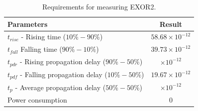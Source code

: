 \begin{table}[H]
	\centering
	\begin{tabular}{|p{.5\linewidth}|c|}
		\hline
		Parameters & Result\\
		\hline
		$t_{rise}$ - Rising time ($10\% - 90\%$) & $58.68\times10^{-12}$\\
		\hline
		$t_{fall}$  Falling time ($90\% - 10\%$) & $39.73\times10^{-12}$\\
		\hline
		$t_{pdr}$ - Rising propagation delay ($90\% - 50\%$) & $\times10^{-12}$\\
		\hline
		$t_{pdf}$ - Falling propagation delay ($10\% - 50\%$) & $19.67\times10^{-12}$\\
		\hline
		$t_{p}$ - Average propagation delay ($50\% - 50\%$) & $\times10^{-12}$\\
		\hline
		Power consumption & $0$\\
		\hline
	\end{tabular}
	\caption{Requirements for measuring EXOR2.}
	\label{f_measuring EXOR2}
\end{table}

